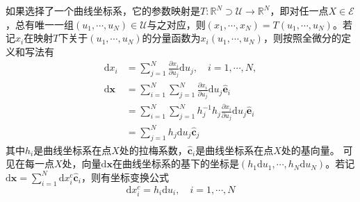 \documentclass[../main.tex]{subfiles}
\begin{document}
如果选择了一个曲线坐标系，它的参数映射是$T:\mathbb{R}^N\supset\mathcal{U}\rightarrow\mathbb{R}^N$，即对任一点$X\in\mathcal{E}$，总有唯一一组$\left(u_1,\cdots,u_N\right)\in\mathcal{U}$与之对应，则$\left(x_1,\cdots,x_N\right)=T\left(u_1,\cdots,u_N\right)$。若记$x_i$在映射$T$下关于$\left(u_1,\cdots,u_N\right)$的分量函数为$x_i\left(u_1,\cdots,u_N\right)$，则按照全微分的定义和写法有
\[
    \begin{aligned}
        \mathrm{d}x_i        & =\sum_{j=1}^N\frac{\partial x_i}{\partial u_j}\mathrm{d}u_j,\quad i=1,\cdots,N,                      \\
        \mathrm{d}\mathbf{x} & =\sum_{i=1}^N\sum_{j=1}^N\frac{\partial x_i}{\partial u_j}\mathrm{d}u_j\mathbf{\hat{e}}_i            \\
                             & =\sum_{i=1}^N\sum_{j=1}^Nh_j^{-1}h_j\frac{\partial x_i}{\partial u_j}\mathrm{d}u_j\mathbf{\hat{e}}_i \\
                             & =\sum_{j=1}^Nh_j\mathrm{d}u_j\mathbf{\hat{c}}_j
    \end{aligned}
\]
其中$h_i$是曲线坐标系在点$X$处的拉梅系数，$\mathbf{\hat{c}}_i$是曲线坐标系在点$X$处的基向量。 可见在每一点$X$处，向量$\mathrm{d}\mathbf{x}$在曲线坐标系的基下的坐标是$\left(h_1\mathrm{d}u_1,\cdots,h_N\mathrm{d}u_N\right)$。若记$\mathrm{d}\mathbf{x}=\sum_{i=1}^N\mathrm{d}x_i^\mathrm{c}\mathbf{\hat{c}}_i$，则有坐标变换公式
\[\mathrm{d}x_i^{c}=h_i\mathrm{d}u_i,\quad i=1,\cdots,N\]
\end{document}
